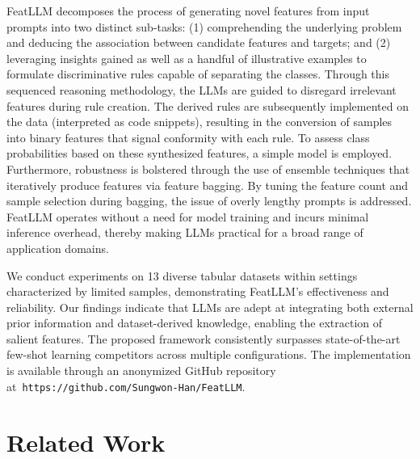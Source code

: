 \textsf{FeatLLM} decomposes the process of generating novel features from input prompts into two distinct sub-tasks: (1) comprehending the underlying problem and deducing the association between candidate features and targets; and (2) leveraging insights gained as well as a handful of illustrative examples to formulate discriminative rules capable of separating the classes. Through this sequenced reasoning methodology, the LLMs are guided to disregard irrelevant features during rule creation. The derived rules are subsequently implemented on the data (interpreted as code snippets), resulting in the conversion of samples into binary features that signal conformity with each rule. To assess class probabilities based on these synthesized features, a simple model is employed. Furthermore, robustness is bolstered through the use of ensemble techniques that iteratively produce features via feature bagging. By tuning the feature count and sample selection during bagging, the issue of overly lengthy prompts is addressed. \textsf{FeatLLM} operates without a need for model training and incurs minimal inference overhead, thereby making LLMs practical for a broad range of application domains.

We conduct experiments on 13 diverse tabular datasets within settings characterized by limited samples, demonstrating \textsf{FeatLLM}'s effectiveness and reliability. Our findings indicate that LLMs are adept at integrating both external prior information and dataset-derived knowledge, enabling the extraction of salient features. The proposed framework consistently surpasses state-of-the-art few-shot learning competitors across multiple configurations. The implementation is available through an anonymized GitHub repository at~\texttt{https://github.com/Sungwon-Han/FeatLLM}.

\section{Related Work}

